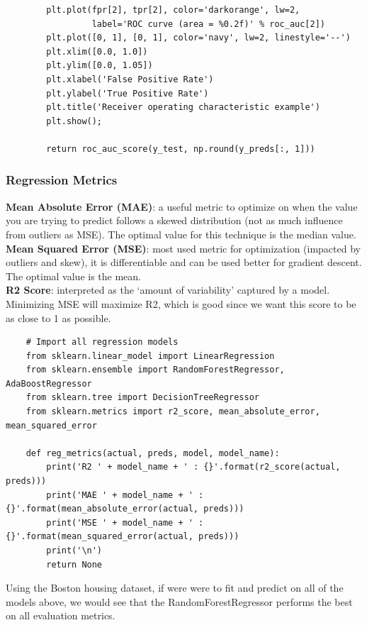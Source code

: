\documentclass[11pt, a4paper]{article}
\begin{document}
\begin{spacing}{1.1}
\begin{lstlisting}
		plt.plot(fpr[2], tpr[2], color='darkorange', lw=2, 
		         label='ROC curve (area = %0.2f)' % roc_auc[2])
		plt.plot([0, 1], [0, 1], color='navy', lw=2, linestyle='--')
		plt.xlim([0.0, 1.0])
		plt.ylim([0.0, 1.05])
		plt.xlabel('False Positive Rate')
		plt.ylabel('True Positive Rate')
		plt.title('Receiver operating characteristic example')
		plt.show();
		
		return roc_auc_score(y_test, np.round(y_preds[:, 1])) \end{lstlisting} \vspace*{1mm}
	\subsubsection{Regression Metrics}
	\textbf{Mean Absolute Error (MAE)}: a useful metric to optimize on when the value you are trying to predict follows a skewed distribution (not as much influence from outliers as MSE). The optimal value for this technique is the median value. \vspace*{2mm}\\
	\textbf{Mean Squared Error (MSE)}: most used metric for optimization (impacted by outliers and skew), it is differentiable and can be used better for gradient descent. The optimal value is the mean. \vspace*{2mm}\\ 
	\textbf{R2 Score}: interpreted as the `amount of variability' captured by a model. Minimizing MSE will maximize R2, which is good since we want this score to be as close to 1 as possible.
	\begin{lstlisting}
	# Import all regression models
	from sklearn.linear_model import LinearRegression
	from sklearn.ensemble import RandomForestRegressor, AdaBoostRegressor
	from sklearn.tree import DecisionTreeRegressor
	from sklearn.metrics import r2_score, mean_absolute_error, mean_squared_error
	
	def reg_metrics(actual, preds, model, model_name):
		print('R2 ' + model_name + ' : {}'.format(r2_score(actual, preds)))
		print('MAE ' + model_name + ' : {}'.format(mean_absolute_error(actual, preds)))
		print('MSE ' + model_name + ' : {}'.format(mean_squared_error(actual, preds)))
		print('\n')
		return None	\end{lstlisting} \vspace*{2mm}
	Using the Boston housing dataset, if were were to fit and predict on all of the models above, we would see that the RandomForestRegressor performs the best on all evaluation metrics. \newpage


\end{spacing}
\end{document}
